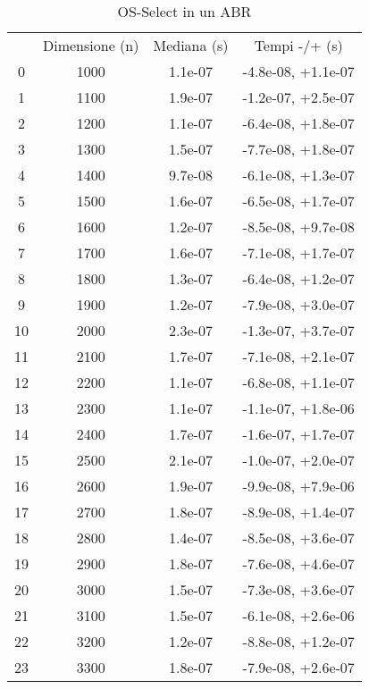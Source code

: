 \begin{table}
\centering
\caption{OS-Select in un ABR}
\label{OS-Select in un ABR}
\begin{adjustbox}{width=1\textwidth/2}
\begin{tabular}{|c|c|c|c|}
\hline
 & Dimensione (n) & Mediana (s) & Tempi -/+ (s) \\
0 & 1000 & 1.1e-07 & -4.8e-08, +1.1e-07 \\
\cline{1-4}
1 & 1100 & 1.9e-07 & -1.2e-07, +2.5e-07 \\
\cline{1-4}
2 & 1200 & 1.1e-07 & -6.4e-08, +1.8e-07 \\
\cline{1-4}
3 & 1300 & 1.5e-07 & -7.7e-08, +1.8e-07 \\
\cline{1-4}
4 & 1400 & 9.7e-08 & -6.1e-08, +1.3e-07 \\
\cline{1-4}
5 & 1500 & 1.6e-07 & -6.5e-08, +1.7e-07 \\
\cline{1-4}
6 & 1600 & 1.2e-07 & -8.5e-08, +9.7e-08 \\
\cline{1-4}
7 & 1700 & 1.6e-07 & -7.1e-08, +1.7e-07 \\
\cline{1-4}
8 & 1800 & 1.3e-07 & -6.4e-08, +1.2e-07 \\
\cline{1-4}
9 & 1900 & 1.2e-07 & -7.9e-08, +3.0e-07 \\
\cline{1-4}
10 & 2000 & 2.3e-07 & -1.3e-07, +3.7e-07 \\
\cline{1-4}
11 & 2100 & 1.7e-07 & -7.1e-08, +2.1e-07 \\
\cline{1-4}
12 & 2200 & 1.1e-07 & -6.8e-08, +1.1e-07 \\
\cline{1-4}
13 & 2300 & 1.1e-07 & -1.1e-07, +1.8e-06 \\
\cline{1-4}
14 & 2400 & 1.7e-07 & -1.6e-07, +1.7e-07 \\
\cline{1-4}
15 & 2500 & 2.1e-07 & -1.0e-07, +2.0e-07 \\
\cline{1-4}
16 & 2600 & 1.9e-07 & -9.9e-08, +7.9e-06 \\
\cline{1-4}
17 & 2700 & 1.8e-07 & -8.9e-08, +1.4e-07 \\
\cline{1-4}
18 & 2800 & 1.4e-07 & -8.5e-08, +3.6e-07 \\
\cline{1-4}
19 & 2900 & 1.8e-07 & -7.6e-08, +4.6e-07 \\
\cline{1-4}
20 & 3000 & 1.5e-07 & -7.3e-08, +3.6e-07 \\
\cline{1-4}
21 & 3100 & 1.5e-07 & -6.1e-08, +2.6e-06 \\
\cline{1-4}
22 & 3200 & 1.2e-07 & -8.8e-08, +1.2e-07 \\
\cline{1-4}
23 & 3300 & 1.8e-07 & -7.9e-08, +2.6e-07 \\

\end{tabular}
\end{adjustbox}
\end{table}
